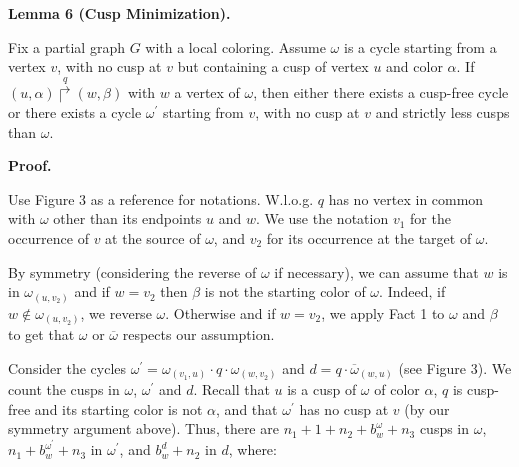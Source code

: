  
 
\par\medskip\noindent\textbf{Lemma 6 (Cusp Minimization).}\par
 
 
Fix a partial graph $G$ with a local coloring. Assume $\omega$ is a cycle starting from a vertex $v$, with no cusp at $v$ but containing a cusp of vertex $u$ and color $\alpha$. If $(u,\alpha)\overset{q}{\Rsh}(w,\beta)$ with $w$ a vertex of $\omega$, then either there exists a cusp-free cycle or there exists a cycle $\omega^{\prime}$ starting from $v$, with no cusp at $v$ and strictly less cusps than $\omega$.\par
 
 
 
 
\par\medskip\noindent\textbf{Proof.}\par
 
 
Use Figure 3 as a reference for notations. W.l.o.g. $q$ has no vertex in common with $\omega$ other than its endpoints $u$ and $w$. We use the notation $v_{1}$ for the occurrence of $v$ at the source of $\omega$, and $v_{2}$ for its occurrence at the target of $\omega$.\par
 
 
 
By symmetry (considering the reverse of $\omega$ if necessary), we can assume that $w$ is in ${\omega}_{(u,v_{2})}$ and if $w=v_{2}$ then $\beta$ is not the starting color of $\omega$. Indeed, if $w\notin{\omega}_{(u,v_{2})}$, we reverse $\omega$. Otherwise and if $w=v_{2}$, we apply Fact 1 to $\omega$ and $\beta$ to get that $\omega$ or $\overline{\omega}$ respects our assumption.\par
 
 
 
Consider the cycles $\omega^{\prime}={\omega}_{(v_{1},u)}\cdot q\cdot{\omega}_{(w,v_{2})}$ and $d=q\cdot{\overline{\omega}}_{(w,u)}$ (see Figure 3). We count the cusps in $\omega$, $\omega^{\prime}$ and $d$. Recall that $u$ is a cusp of $\omega$ of color $\alpha$, $q$ is cusp-free and its starting color is not $\alpha$, and that $\omega^{\prime}$ has no cusp at $v$ (by our symmetry argument above). Thus, there are $n_{1}+1+n_{2}+b^{\omega}_{w}+n_{3}$ cusps in $\omega$, $n_{1}+b^{\omega^{\prime}}_{w}+n_{3}$ in $\omega^{\prime}$, and $b^{d}_{w}+n_{2}$ in $d$, where:\par
  
